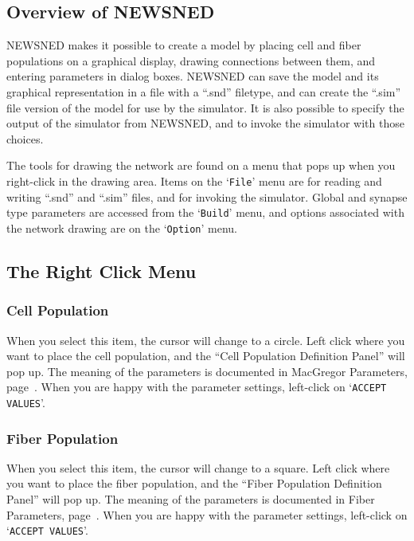 \documentclass[12pt,openany,oneside]{book}
\newcommand{\tisamp}[1]{`\texttt{#1}'}
\newcommand{\tiref}[1]{#1, page~\pageref{#1}}
\begin{document}
\subsection{Overview of NEWSNED}

NEWSNED makes it possible to create a model by placing cell and fiber
populations on a graphical display, drawing connections between them,
and entering parameters in dialog boxes.  NEWSNED can save the model
and its graphical representation in a file with a ``.snd'' filetype,
and can create the ``.sim'' file version of the model for use by the
simulator.  It is also possible to specify the output of the simulator
from NEWSNED, and to invoke the simulator with those choices.

The tools for drawing the network are found on a menu that pops up
when you right-click in the drawing area.  Items on the \tisamp{File}
menu are for reading and writing ``.snd'' and ``.sim'' files, and for
invoking the simulator.  Global and synapse type parameters are accessed
from the \tisamp{Build} menu, and options associated with the network
drawing are on the \tisamp{Option} menu.

\subsection{The Right Click Menu}
\label{Right Click}

\subsubsection*{Cell Population}

When you select this item, the cursor will change to a circle.  Left
click where you want to place the cell population, and the ``Cell
Population Definition Panel'' will pop up.  The meaning of the
parameters is documented in \tiref{MacGregor Parameters}.  When you are
happy with the parameter settings, left-click on \tisamp{ACCEPT VALUES}.

\subsubsection*{Fiber Population}

When you select this item, the cursor will change to a square.  Left
click where you want to place the fiber population, and the ``Fiber
Population Definition Panel'' will pop up.  The meaning of the
parameters is documented in \tiref{Fiber Parameters}.  When you are
happy with the parameter settings, left-click on \tisamp{ACCEPT VALUES}.
\end{document}
